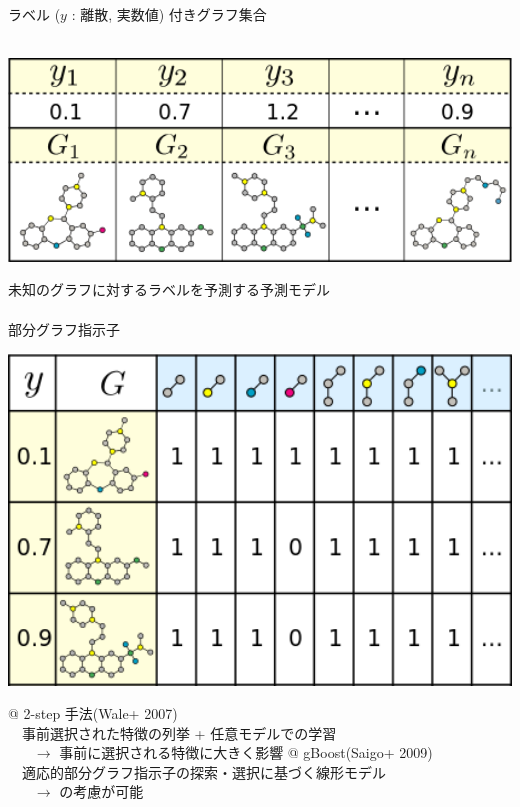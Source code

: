 \begin{tcolorbox}[title={\Large グラフに対する教師付き学習}]
	ラベル ($y$ : 離散, 実数値) 付きグラフ集合 \\
	\vspace{-85pt} \\
	\begin{center}
		\includegraphics[width=470pt]{img/graph_classify.png}
	\end{center}
	未知のグラフに対するラベルを予測する予測モデル \\
	\vspace{-25pt} \\
	部分グラフ指示子 \\
	\vspace{-40pt}
	\begin{center}
		\includegraphics[width=470pt]{img/graph_indicator.png}
	\end{center}
	\vspace{-10pt}
	\begin{easylist}[itemize]
	@ 2-step 手法(Wale+ 2007) \\
	$~~~$ \alert{事前選択された特徴}の列挙 + 任意モデルでの学習 \\
	$~~~~~~~~ \rightarrow$ 事前に選択される特徴に大きく影響
	@ gBoost(Saigo+ 2009) \\
	$~~~$ 適応的部分グラフ指示子の探索・選択に基づく\alert{線形}モデル \\
	$~~~~~~~~ \rightarrow$ の考慮が可能
	\end{easylist}
\end{tcolorbox}

